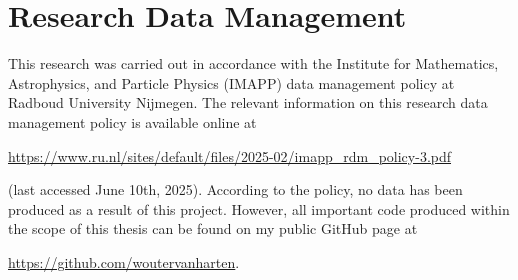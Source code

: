 \chapter*{Research Data Management}
This research was carried out in accordance with the Institute for Mathematics, Astrophysics, and Particle Physics (IMAPP) data management policy at Radboud University Nijmegen.
The relevant information on this research data management policy is available online at

\href{https://www.ru.nl/sites/default/files/2025-02/imapp_rdm_policy-3.pdf}{https://www.ru.nl/sites/default/files/2025-02/imapp\_rdm\_policy-3.pdf}

(last accessed June 10th, 2025).
According to the policy, no data has been produced as a result of this project.
However, all important code produced within the scope of this thesis can be found on my public GitHub page at

\href{https://github.com/woutervanharten/}{https://github.com/woutervanharten}.


\newpage\null\thispagestyle{empty}